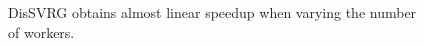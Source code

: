\documentclass[10pt,journal,finalsubmission,compsoc]{IEEEtran}
\begin{document}
\begin{figure}
\centering
{}
\caption{DisSVRG obtains almost linear speedup when varying the number of workers.}
\label{figure_evaluation2_speedup}
\end{figure}
\end{document}
